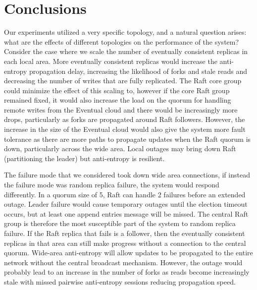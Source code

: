 \documentclass[10pt,conference,letterpaper]{IEEEtran}
\begin{document}
\section{Conclusions}

Our experiments utilized a very specific topology, and a natural question arises: what are the effects of different topologies on the performance of the system? Consider the case where we scale the number of eventually consistent replicas in each local area. More eventually consistent replicas would increase the anti-entropy propagation delay, increasing the likelihood of forks and stale reads and decreasing the number of writes that are fully replicated. The Raft core group could minimize the effect of this scaling to, however if the core Raft group remained fixed, it would also increase the load on the quorum for handling remote writes from the Eventual cloud and there would be increasingly more drops, particularly as forks are propagated around Raft followers. However, the increase in the size of the Eventual cloud would also give the system more fault tolerance as there are more paths to propagate updates when the Raft quorum is down, particularly across the wide area. Local outages may bring down Raft (partitioning the leader) but anti-entropy is resilient.

The failure mode that we considered took down wide area connections, if instead the failure mode was random replica failure, the system would respond differently. In a quorum size of 5, Raft can handle 2 failures before an extended outage. Leader failure would cause temporary outages until the election timeout occurs, but at least one append entries message will be missed. The central Raft group is therefore the most susceptible part of the system to random replica failure. If the Raft replica that fails is a follower, then the eventually consistent replicas in that area can still make progress without a connection to the central quorum. Wide-area anti-entropy will allow updates to be propagated to the entire network without the central broadcast mechanism. However, the outage would probably lead to an increase in the number of forks as reads become increasingly stale with missed pairwise anti-entropy sessions reducing propagation speed.
\end{document}
